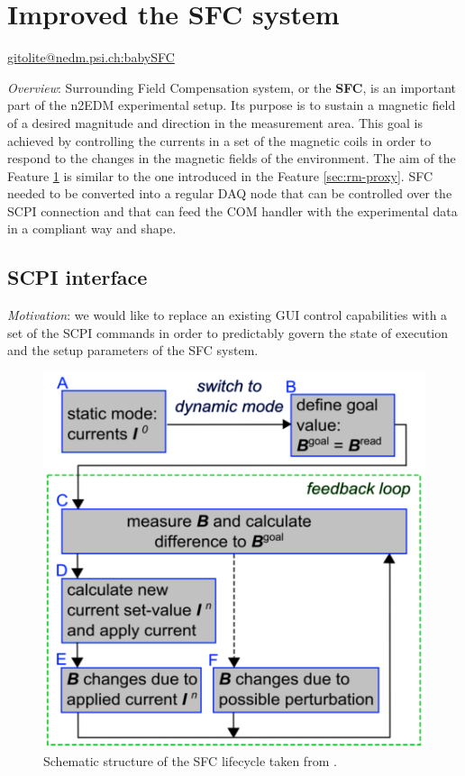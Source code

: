 \section{Improved the SFC system}
\label{sec:sfc}

\url{gitolite@nedm.psi.ch:babySFC}

\textit{Overview}: Surrounding Field Compensation \cite{Franke2013, Rawlik2018a} system, or the \textbf{SFC}, is an important part of the n2EDM experimental setup. Its purpose is to sustain a magnetic field of a desired magnitude and direction in the measurement area. This goal is achieved by controlling the currents in a set of the magnetic coils \cite{Rawlik2018} in order to respond to the changes in the magnetic fields of the environment. The aim of the Feature \ref{sec:sfc} is similar to the one introduced in the Feature \ref{sec:rm-proxy}. SFC needed to be converted into a regular DAQ node that can be controlled over the SCPI connection and that can feed the COM handler with the experimental data in a compliant \cite{Bison2018} way and shape.

\subsection{SCPI interface}
\label{subsec:sfc_scpi}

\textit{Motivation}: we would like to replace an existing GUI control capabilities with a set of the SCPI commands in order to predictably govern the state of execution and the setup parameters of the SFC system.

\begin{figure}[h]
	\centering
	\includegraphics[width=\textwidth]{img/sfc_algorithm}
	\caption{Schematic structure of the SFC lifecycle taken from \cite{Franke2013}.}
	\label{fig:sfc_algorithm}
\end{figure}

